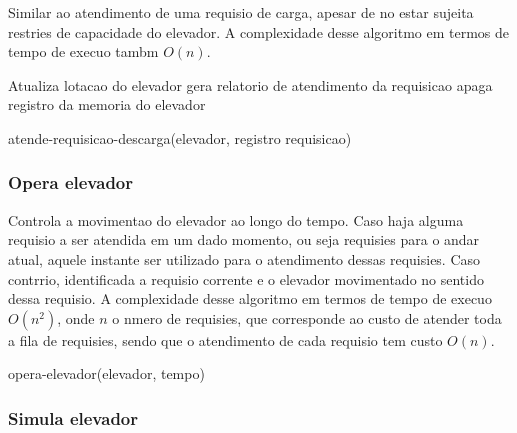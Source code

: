 \documentclass[12pt]{article}
\begin{document}
Similar ao atendimento de uma requisio de carga, apesar de no estar sujeita  restries de capacidade do elevador. A complexidade desse algoritmo em termos de tempo de execuo tambm  $O(n)$.
\begin{algorithm}[h!]
\begin{footnotesize}


	Atualiza lotacao do elevador\;
	gera relatorio de atendimento da requisicao\;
	apaga registro da memoria do elevador\;

\caption{atende-requisicao-descarga(elevador, registro requisicao)}%
\end{footnotesize}
\end{algorithm}


\subsubsection{Opera elevador}

Controla a movimentao do elevador ao longo do tempo. Caso haja alguma requisio a ser atendida em um dado momento, ou seja requisies para o andar atual, aquele instante ser utilizado para o atendimento dessas requisies. Caso contrrio,  identificada a requisio corrente e o elevador  movimentado no sentido dessa requisio. A complexidade desse algoritmo em termos de tempo de execuo  $O(n^2)$, onde $n$  o nmero de requisies, que corresponde ao custo de atender toda a fila de requisies, sendo que o atendimento de cada requisio tem custo $O(n)$.
\begin{algorithm}[h!]
\begin{footnotesize}


\caption{opera-elevador(elevador, tempo)}%
\end{footnotesize}
\end{algorithm}


\subsubsection{Simula elevador}
\end{document}
